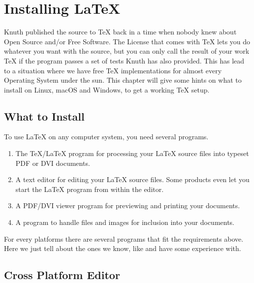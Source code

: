 \appendix
\chapter{Installing \LaTeX}
\begin{intro}
Knuth published the source to \TeX{} back in a time when nobody knew
about Open Source and/or Free Software. The License that comes with \TeX{}
lets you do whatever you want with the source, but you can only call the
result of your work \TeX{} if the program passes a set of tests Knuth has
also provided. This has lead to a situation where we have free \TeX{}
implementations for almost every Operating System under the sun. This chapter
will give some hints on what to install on Linux, macOS and Windows, to
get a working \TeX{} setup.
\end{intro}

\section{What to Install}

To use \LaTeX{} on any computer system, you need several programs.

\begin{enumerate}

\item The \TeX{}/\LaTeX{} program for processing your \LaTeX{} source files
into typeset PDF or DVI documents.

\item A text editor for editing your \LaTeX{} source files. Some products even let
you start the \LaTeX{} program from within the editor.

\item A PDF/DVI viewer program for previewing and printing your
documents.

\item A program to handle \PSi{} files and images for inclusion into
your documents.

\end{enumerate}

For every platforms there are several programs that fit the requirements above.
Here we just tell about the ones we know, like and have some experience
with.

\section{Cross Platform Editor}
\label{sec:texmaker}

